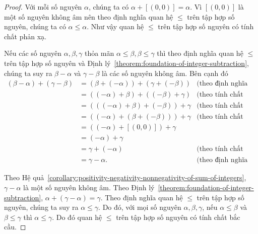 \begin{proof}
	Với mỗi số nguyên $\alpha$, chúng ta có $\alpha + [(0,0)] = \alpha$. Vì $[(0,0)]$ là một số nguyên không âm nên theo định nghĩa quan hệ $\leq$ trên tập hợp số nguyên, chúng ta có $\alpha\leq \alpha$. Như vậy quan hệ $\leq$ trên tập hợp số nguyên có tính chất phản xạ.

	Nếu các số nguyên $\alpha, \beta, \gamma$ thỏa mãn $\alpha\leq \beta, \beta\leq\gamma$ thì theo định nghĩa quan hệ $\leq$ trên tập hợp số nguyên và Định lý~\ref{theorem:foundation-of-integer-subtraction}, chúng ta suy ra $\beta - \alpha$ và $\gamma - \beta$ là các số nguyên không âm. Bên cạnh đó
	\begin{align*}
		(\beta - \alpha) + (\gamma - \beta) & = (\beta + (-\alpha)) + (\gamma + (-\beta)) & \text{(theo định nghĩa phép trừ trên tập hợp số nguyên)}  \\
		                                    & = ((-\alpha) + \beta) + ((-\beta) + \gamma) & \text{(theo tính chất giao hoán của phép cộng số nguyên)} \\
		                                    & = (((-\alpha) + \beta) + (-\beta)) + \gamma & \text{(theo tính chất kết hợp của phép cộng số nguyên)}   \\
		                                    & = ((-\alpha) + (\beta + (-\beta))) + \gamma & \text{(theo tính chất kết hợp của phép cộng số nguyên)}   \\
		                                    & = ((-\alpha) + [(0,0)]) + \gamma                                                                        \\
		                                    & = (-\alpha) + \gamma                                                                                    \\
		                                    & = \gamma + (-\alpha)                        & \text{(theo tính chất giao hoán của phép cộng số nguyên)} \\
		                                    & = \gamma - \alpha.                          & \text{(theo định nghĩa phép trừ trên tập hợp số nguyên)}
	\end{align*}

	Theo Hệ quả~\ref{corollary:positivity-negativity-nonnegativity-of-sum-of-integers}, $\gamma - \alpha$ là một số nguyên không âm. Theo Định lý~\ref{theorem:foundation-of-integer-subtraction}, $\alpha + (\gamma - \alpha) = \gamma$. Theo định nghĩa quan hệ $\leq$ trên tập hợp số nguyên, chúng ta suy ra $\alpha\leq\gamma$. Do đó, với mọi số nguyên $\alpha,\beta,\gamma$, nếu $\alpha\leq\beta$ và $\beta\leq\gamma$ thì $\alpha\leq\gamma$. Do đó quan hệ $\leq$ trên tập hợp số nguyên có tính chất bắc cầu.


\end{proof}
